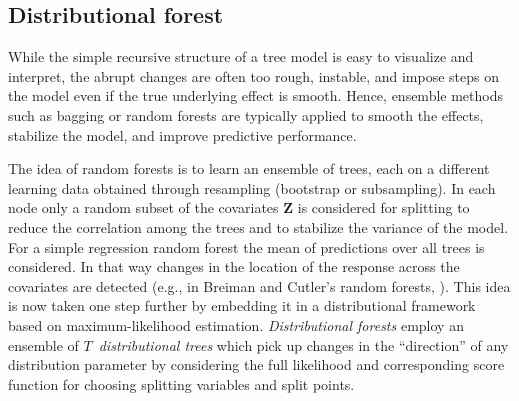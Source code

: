 \documentclass[aoas, preprint]{imsart}
\numberwithin{equation}{subsection}
\begin{document}
\subsection{Distributional forest}
\label{sec:distforest}

While the simple recursive structure of a tree model is easy to visualize and
interpret, the abrupt changes are often too rough, instable, and impose steps
on the model even if the true underlying effect is smooth. Hence, ensemble
methods such as bagging or random forests \citep{Breiman:2001} are typically
applied to smooth the effects, stabilize the model, and improve predictive performance.

The idea of random forests is to learn an ensemble of trees, each on a different
learning data obtained through resampling (bootstrap or subsampling). In each node 
only a random subset of the covariates $\bm{Z}$ is considered for splitting to reduce the 
correlation among the trees and to stabilize the variance of the model.
For a simple regression random forest the mean of predictions over
all trees is considered. In that way changes in the location  of the response 
across the covariates are detected (e.g., in Breiman and Cutler's random forests, 
\citealp{Breiman:2001}).
This idea is now taken one step further by embedding it in a distributional 
framework based on maximum-likelihood estimation. \emph{Distributional forests} 
employ an ensemble of $T$~\emph{distributional trees} which pick up changes in 
the ``direction'' of any distribution parameter by considering the full likelihood
and corresponding score function for choosing splitting variables and split points.
\end{document}

